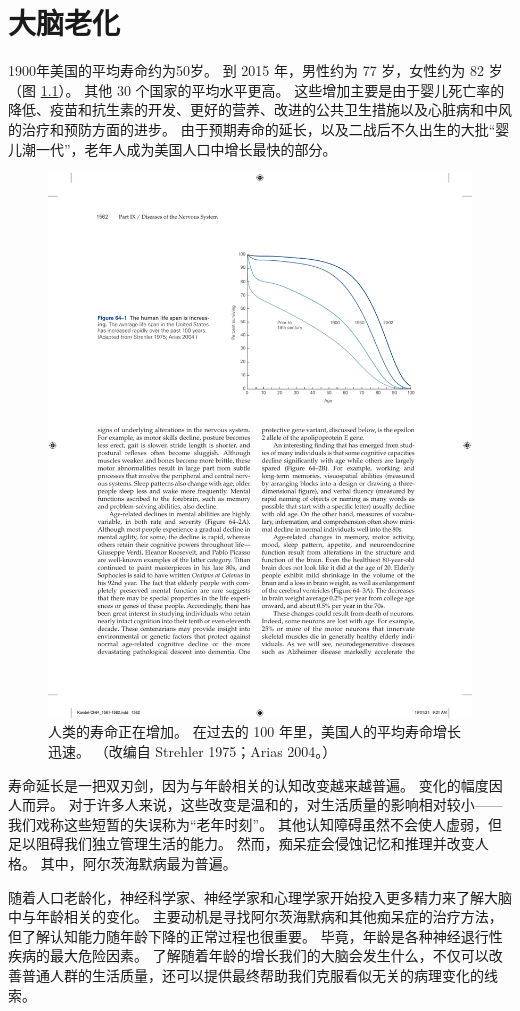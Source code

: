\chapter{大脑老化} \label{chap:chap64}

1900年美国的平均寿命约为50岁。
到 2015 年，男性约为 77 岁，女性约为 82 岁（图 \ref{fig:64_1}）。
其他 30 个国家的平均水平更高。 这些增加主要是由于婴儿死亡率的降低、疫苗和抗生素的开发、更好的营养、改进的公共卫生措施以及心脏病和中风的治疗和预防方面的进步。
由于预期寿命的延长，以及二战后不久出生的大批“婴儿潮一代”，老年人成为美国人口中增长最快的部分。


\begin{figure}[htbp]
	\centering
	\includegraphics[width=0.7\linewidth]{chap64/fig_64_1}
	\caption{人类的寿命正在增加。 在过去的 100 年里，美国人的平均寿命增长迅速。 （改编自 Strehler 1975；Arias 2004。）}
	\label{fig:64_1}
\end{figure}


寿命延长是一把双刃剑，因为与年龄相关的认知改变越来越普遍。
变化的幅度因人而异。
对于许多人来说，这些改变是温和的，对生活质量的影响相对较小——我们戏称这些短暂的失误称为“老年时刻”。
其他认知障碍虽然不会使人虚弱，但足以阻碍我们独立管理生活的能力。
然而，痴呆症会侵蚀记忆和推理并改变人格。
其中，阿尔茨海默病最为普遍。


随着人口老龄化，神经科学家、神经学家和心理学家开始投入更多精力来了解大脑中与年龄相关的变化。
主要动机是寻找阿尔茨海默病和其他痴呆症的治疗方法，但了解认知能力随年龄下降的正常过程也很重要。
毕竟，年龄是各种神经退行性疾病的最大危险因素。
了解随着年龄的增长我们的大脑会发生什么，不仅可以改善普通人群的生活质量，还可以提供最终帮助我们克服看似无关的病理变化的线索。


